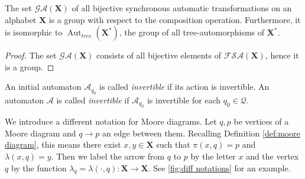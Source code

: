 \documentclass[mat1]{fmfdeloTS2.0}
\newcommand{\obs}{}				%
\newcommand{\abece}{\mathbf{X}}			%
\newcommand{\fslovar}{\mathbf{X^*}}		%
\newcommand{\auto}{\mathcal}			%
\newcommand{\QQ}{\mathcal{Q}}			%
\newcommand{\semisynaut}{\mathcal{FSA}}	%
\newcommand{\synaut}{\mathcal{GA}}	%
\DeclareMathOperator{\aut}{\mathrm{Aut}}		%
\begin{document}
\begin{proposition}
The set $\synaut(\abece)$ of all \obs{bijective} synchronous automatic transformations on an alphabet $\abece$ is a group with respect to the composition operation. Furthermore, it is isomorphic to $\aut_{tree}(\fslovar)$, the group of all tree-automorphisms of $\fslovar$.
\label{prop:aut_tree isomorph to synaut}
\end{proposition}
\begin{proof}
The set $\synaut(\abece)$ consists of all bijective elements of $\semisynaut(\abece)$, hence it is a group.
\end{proof}

\begin{definition}
An initial automaton $\auto{A}_{q_0}$ is called \emph{invertible} if its action is invertible. An automaton $\auto{A}$ is called \emph{invertible} if $\auto{A}_{q_0}$ is invertible for each $q_0\in\QQ$.
\end{definition}

\begin{remark}
We introduce a different notation for Moore diagrams. Let $q,p$ be vertices of a Moore diagram and $q\longrightarrow p$ an edge between them. Recalling Definition \autoref{def:moore diagram}, this means there exist $x,y\in\abece$ such that $\pi(x,q)=p$ and $\lambda(x,q)=y$. Then we label the arrow from $q$ to $p$ by the letter $x$ and the vertex $q$ by the function $\lambda_{q}=\lambda(\cdot,q):\abece\longrightarrow\abece$. See \autoref{fig:diff notations} for an example.
\end{remark}
\end{document}

